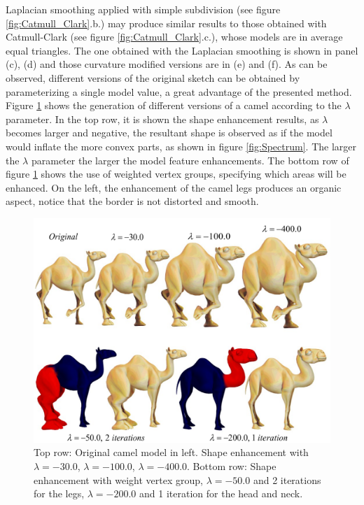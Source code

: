 \documentclass[10pt, conference]{IEEEtran}
\begin{document}
Laplacian smoothing applied with simple subdivision (see figure \ref{fig:Catmull_Clark}.b.)
may produce similar results to those obtained with Catmull-Clark (see
figure \ref{fig:Catmull_Clark}.c.), whose models are in average equal
triangles. The one obtained with the Laplacian smoothing is shown
in panel (c), (d) and those curvature modified versions are in (e)
and (f). As can be observed, different versions of the original sketch
can be obtained by parameterizing a single model value, a great advantage
of the presented method. Figure \ref{fig:camello_enhanced} shows
the generation of different versions of a camel according to the $\lambda$
parameter. In the top row, it is shown the shape enhancement results,
as $\lambda$ becomes larger and negative, the resultant shape is
observed as if the model would inflate the more convex parts, as shown
in figure \ref{fig:Spectrum}. The larger the $\lambda$ parameter
the larger the model feature enhancements. The bottom row of figure
\ref{fig:camello_enhanced} shows the use of weighted vertex groups,
specifying which areas will be enhanced. On the left, the enhancement
of the camel legs produces an organic aspect, notice that the border
is not distorted and smooth.

\begin{figure}
\includegraphics[width=1\columnwidth]{figs/camello_enhanced2}

\caption{\label{fig:camello_enhanced}Top row: Original camel model in left.
Shape enhancement with $\lambda=-30.0$, $\lambda=-100.0$, $\lambda=-400.0$.
Bottom row: Shape enhancement with weight vertex group, $\lambda=-50.0$
and 2 iterations for the legs, $\lambda=-200.0$ and 1 iteration for
the head and neck.}
\end{figure}
\end{document}
